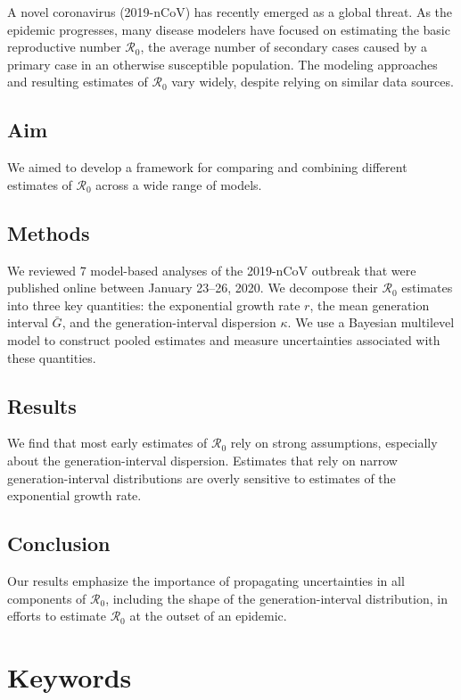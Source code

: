 \documentclass[12pt]{article}
\newcommand{\Ro}{\ensuremath{{\mathcal R}_{0}}\xspace}
\begin{document}
A novel coronavirus (2019-nCoV) has recently emerged as a global threat.
As the epidemic progresses, many disease modelers have focused on estimating the basic reproductive number \Ro, the average number of secondary cases caused by a primary case in an otherwise susceptible population.
The modeling approaches and resulting estimates of \Ro vary widely, despite relying on similar data sources.

\subsection*{Aim}

We aimed to develop a framework for comparing and combining different estimates of \Ro across a wide range of models.

\subsection*{Methods}

We reviewed 7 model-based analyses of the 2019-nCoV outbreak that were published online between January 23--26, 2020.
We decompose their \Ro estimates into three key quantities: the exponential growth rate $r$, the mean generation interval $\bar G$, and the generation-interval dispersion $\kappa$.
We use a Bayesian multilevel model to construct pooled estimates and measure uncertainties associated with these quantities.

\subsection*{Results}

We find that most early estimates of \Ro rely on strong assumptions, especially about the generation-interval dispersion.
Estimates that rely on narrow generation-interval distributions are overly sensitive to estimates of the exponential growth rate.

\subsection*{Conclusion}

Our results emphasize the importance of propagating uncertainties in all components of \Ro, including the shape of the generation-interval distribution, in efforts to estimate \Ro at the outset of an epidemic.

\pagebreak

\section*{Keywords}
\end{document}

